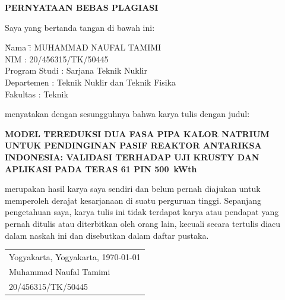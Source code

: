 \documentclass[
  indonesian,
  12pt,
  a4paper,
]{report}
\newcommand{\judul}{MODEL TEREDUKSI DUA FASA PIPA KALOR NATRIUM UNTUK PENDINGINAN PASIF REAKTOR ANTARIKSA INDONESIA: VALIDASI TERHADAP UJI KRUSTY DAN APLIKASI PADA TERAS 61 PIN 500~kWth}
\newcommand{\nama}{Muhammad Naufal Tamimi}
\newcommand{\nim}{20/456315/TK/50445}
\newcommand{\prodi}{Teknik Nuklir}
\newcommand{\kotatanggal}{Yogyakarta, \today}
\begin{document}
\thispagestyle{plain}
\begin{singlespace}
\begin{center}
{\bfseries\MakeUppercase{PERNYATAAN BEBAS PLAGIASI}}\\[0.8cm]
\end{center}
\noindent Saya yang bertanda tangan di bawah ini:
\begin{tabbing}
\hspace{1.2cm}\= Nama \hspace{2.0cm}\= : \MakeUppercase{\nama} \\
\> NIM \> : \nim \\
\> Program Studi \> : Sarjana \prodi \\
\> Departemen \> : Teknik Nuklir dan Teknik Fisika \\
\> Fakultas \> : Teknik \\
\end{tabbing}
\vspace{0.3cm}
\noindent menyatakan dengan sesungguhnya bahwa karya tulis dengan judul:
\begin{center}
\textbf{\judul}
\end{center}
\noindent merupakan hasil karya saya sendiri dan belum pernah diajukan untuk memperoleh derajat kesarjanaan di suatu perguruan tinggi. Sepanjang pengetahuan saya, karya tulis ini tidak terdapat karya atau pendapat yang pernah ditulis atau diterbitkan oleh orang lain, kecuali secara tertulis diacu dalam naskah ini dan disebutkan dalam daftar pustaka.

\vspace{0.6cm}
\begin{flushright}
\begin{tabular}{l}
Yogyakarta, \kotatanggal \\[1.2cm]
\nama \\
\nim
\end{tabular}
\end{flushright}
\end{singlespace}
\clearpage
\end{document}
